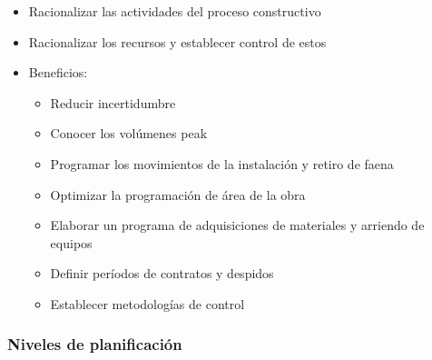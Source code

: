 \documentclass{article} %
\begin{document}
\begin{itemize}[label={},left=0pt,align=parleft]
    \item \begin{highlightbox}[levelone] Racionalizar las actividades del proceso constructivo \end{highlightbox}
    \item \begin{highlightbox}[levelone] Racionalizar los recursos y establecer control de estos \end{highlightbox}
    \item \begin{highlightbox}[levelone] Beneficios: \end{highlightbox}
    \begin{itemize}[label={},left=1em,align=parleft]
        \item \begin{highlightbox}[leveltwo] Reducir incertidumbre \end{highlightbox}
        \item \begin{highlightbox}[leveltwo] Conocer los volúmenes peak \end{highlightbox}
        \item \begin{highlightbox}[leveltwo] Programar los movimientos de la instalación y retiro de faena \end{highlightbox}
        \item \begin{highlightbox}[leveltwo] Optimizar la programación de área de la obra \end{highlightbox}
        \item \begin{highlightbox}[leveltwo] Elaborar un programa de adquisiciones de materiales y arriendo de equipos \end{highlightbox}
        \item \begin{highlightbox}[leveltwo] Definir períodos de contratos y despidos \end{highlightbox}
        \item \begin{highlightbox}[leveltwo] Establecer metodologías de control \end{highlightbox}
    \end{itemize}
\end{itemize}

\subsubsection{Niveles de planificación}
\end{document}
